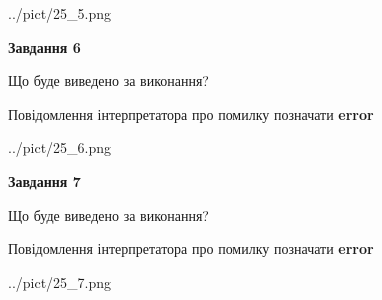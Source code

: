 \documentclass[10pt, ukrainian]{article}
\begin{document}
{\begin {large}
\begin{center}
	{../pict/25_5.png}
\end{center}
\newpage

{\begin {center}\textbf{Завдання 6}\end {center}}\par
Що буде виведено за виконання? \par
Повідомлення інтерпретатора про помилку позначати \textbf{error}

\begin{center}
	{../pict/25_6.png}
\end{center}
\newpage

{\begin {center}\textbf{Завдання 7}\end {center}}\par
Що буде виведено за виконання? \par
Повідомлення інтерпретатора про помилку позначати \textbf{error}

\begin{center}
	{../pict/25_7.png}
\end{center}
\newpage

\end {large}}
\end{document}
